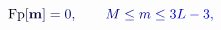 \documentclass[12pt]{article}
\begin{document}
\makeatletter
\renewcommand*{\@textcolor}[3]{%
  \protect\leavevmode
  \begingroup
    \color#1{#2}#3%
  \endgroup
}
\makeatother
\begin{displaymath}
\mathrm { \mathcolor[RGB]{0,0,15}{F} \mathcolor[RGB]{0,0,30}{p} } \mathbf { \mathcolor[RGB]{0,0,45}{\left[} \mathbf { \mathcolor[RGB]{0,0,60}{m} } \mathcolor[RGB]{0,0,75}{\right]} } \mathcolor[RGB]{0,0,90}{=} \mathcolor[RGB]{0,0,105}{0} \mathcolor[RGB]{0,0,120}{,} \qquad \mathcolor[RGB]{0,0,135}{M} \mathcolor[RGB]{0,0,150}{\leq} \mathcolor[RGB]{0,0,165}{m} \mathcolor[RGB]{0,0,180}{\leq} \mathcolor[RGB]{0,0,195}{3} \mathcolor[RGB]{0,0,210}{L} \mathcolor[RGB]{0,0,225}{-} \mathcolor[RGB]{0,0,240}{3} \mathcolor[RGB]{0,0,255}{,}
\end{displaymath}
\end{document}
